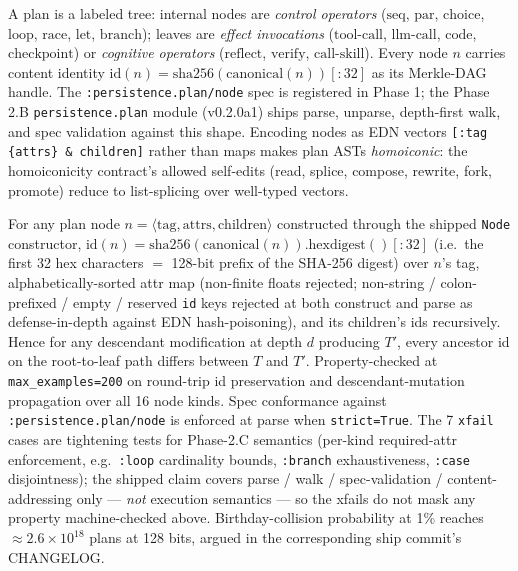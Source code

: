 \documentclass[anon]{nesy2026}   %
\newcommand{\C}[1]{\texttt{#1}}
\begin{document}
A plan is a labeled tree: internal nodes are \emph{control operators} ($\text{seq}$, $\text{par}$, $\text{choice}$, $\text{loop}$, $\text{race}$, $\text{let}$, $\text{branch}$); leaves are \emph{effect invocations} ($\text{tool-call}$, $\text{llm-call}$, $\text{code}$, $\text{checkpoint}$) or \emph{cognitive operators} ($\text{reflect}$, $\text{verify}$, $\text{call-skill}$). Every node $n$ carries content identity $\text{id}(n) = \text{sha256}(\text{canonical}(n))[:32]$ as its Merkle-DAG handle. The \C{:persistence.plan/node} spec is registered in Phase 1; the Phase 2.B \C{persistence.plan} module (v0.2.0a1) ships parse, unparse, depth-first walk, and spec validation against this shape. Encoding nodes as EDN vectors \C{[:tag \{attrs\} \& children]} rather than maps makes plan ASTs \emph{homoiconic}: the homoiconicity contract's allowed self-edits (read, splice, compose, rewrite, fork, promote) reduce to list-splicing over well-typed vectors.

\begin{proposition}\label{prop:plan}
For any plan node $n = \langle \text{tag}, \text{attrs}, \text{children} \rangle$ constructed through the shipped \C{Node} constructor, $\text{id}(n) = \text{sha256}(\text{canonical}(n)).\text{hexdigest}()[{:}32]$ (i.e.\ the first 32 hex characters $=$ 128-bit prefix of the SHA-256 digest) over $n$'s tag, alphabetically-sorted attr map (non-finite floats rejected; non-string / colon-prefixed / empty / reserved \C{id} keys rejected at both construct and parse as defense-in-depth against EDN hash-poisoning), and its children's ids recursively. Hence for any descendant modification at depth $d$ producing $T'$, every ancestor id on the root-to-leaf path differs between $T$ and $T'$. Property-checked at \C{max\_examples=200} on round-trip id preservation and descendant-mutation propagation over all 16 node kinds. Spec conformance against \C{:persistence.plan/node} is enforced at parse when \C{strict=True}. The 7 \C{xfail} cases are tightening tests for Phase-2.C semantics (per-kind required-attr enforcement, e.g.\ \C{:loop} cardinality bounds, \C{:branch} exhaustiveness, \C{:case} disjointness); the shipped claim covers parse / walk / spec-validation / content-addressing only --- \emph{not} execution semantics --- so the xfails do not mask any property machine-checked above. Birthday-collision probability at 1\% reaches $\approx 2.6 \times 10^{18}$ plans at 128 bits, argued in the corresponding ship commit's CHANGELOG.
\end{proposition}
\end{document}
